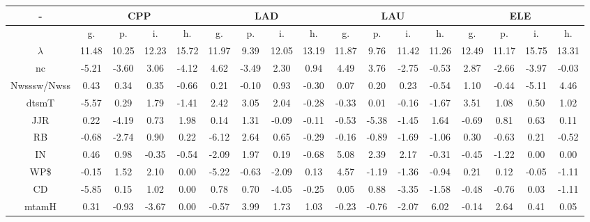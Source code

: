 \documentclass[%
 aip,
 jmp,%
 amsmath,amssymb,
 reprint,%
]{revtex4-1}
\begin{document}
\begin{table}
    \centering
    \footnotesize
\setlength{\tabcolsep}{.26667em}
\begin{tabular}{|c|| c|c|c|c|| c|c|c|c|| c|c|c|c|| c|c|c|c|}\hline
-\-  & \multicolumn{4}{c|}{CPP} & \multicolumn{4}{c|}{LAD} & \multicolumn{4}{c|}{LAU} & \multicolumn{4}{c|}{ELE} \\ \hline\hline
 & g. & p. & i. & h. &     g. & p. & i. & h. &    g. & p. & i. & h. &    g. & p. & i. & h. \\\hline
$\lambda$ & 11.48 & 10.25 & 12.23 & 15.72 & 11.97 & 9.39 & 12.05 & 13.19 & 11.87 & 9.76 & 11.42 & 11.26 & 12.49 & 11.17 & 15.75 & 13.31 \\\hline
nc & -5.21 & -3.60 & 3.06 & -4.12 & 4.62 & -3.49 & 2.30 & 0.94 & 4.49 & 3.76 & -2.75 & -0.53 & 2.87 & -2.66 & -3.97 & -0.03 \\\hline
Nwsssw/Nwss & 0.43 & 0.34 & 0.35 & -0.66 & 0.21 & -0.10 & 0.93 & -0.30 & 0.07 & 0.20 & 0.23 & -0.54 & 1.10 & -0.44 & -5.11 & 4.46 \\\hline
dtsmT & -5.57 & 0.29 & 1.79 & -1.41 & 2.42 & 3.05 & 2.04 & -0.28 & -0.33 & 0.01 & -0.16 & -1.67 & 3.51 & 1.08 & 0.50 & 1.02 \\\hline
JJR & 0.22 & -4.19 & 0.73 & 1.98 & 0.14 & 1.31 & -0.09 & -0.11 & -0.53 & -5.38 & -1.45 & 1.64 & -0.69 & 0.81 & 0.63 & 0.11 \\\hline
RB & -0.68 & -2.74 & 0.90 & 0.22 & -6.12 & 2.64 & 0.65 & -0.29 & -0.16 & -0.89 & -1.69 & -1.06 & 0.30 & -0.63 & 0.21 & -0.52 \\\hline
IN & 0.46 & 0.98 & -0.35 & -0.54 & -2.09 & 1.97 & 0.19 & -0.68 & 5.08 & 2.39 & 2.17 & -0.31 & -0.45 & -1.22 & 0.00 & 0.00 \\\hline
WP\$ & -0.15 & 1.52 & 2.10 & 0.00 & -5.22 & -0.63 & -2.09 & 0.13 & 4.57 & -1.19 & -1.36 & -0.94 & 0.21 & 0.12 & -0.05 & -1.11 \\\hline
CD & -5.85 & 0.15 & 1.02 & 0.00 & 0.78 & 0.70 & -4.05 & -0.25 & 0.05 & 0.88 & -3.35 & -1.58 & -0.48 & -0.76 & 0.03 & -1.11 \\\hline
mtamH & 0.31 & -0.93 & -3.67 & 0.00 & -0.57 & 3.99 & 1.73 & 1.03 & -0.23 & -0.76 & -2.07 & 6.02 & -0.14 & 2.64 & 0.41 & 0.05 \\\hline

\end{tabular}
\end{table}
\end{document}
